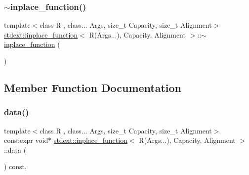 \subsubsection{\texorpdfstring{$\sim$inplace\+\_\+function()}{~inplace\_function()}\hspace{0.1cm}{\footnotesize\ttfamily [2/2]}}
{\footnotesize\ttfamily template$<$class R , class... Args, size\+\_\+t Capacity, size\+\_\+t Alignment$>$ \\
\hyperlink{classstdext_1_1inplace__function}{stdext\+::inplace\+\_\+function}$<$ R(Args...), Capacity, Alignment $>$\+::$\sim$\hyperlink{classstdext_1_1inplace__function}{inplace\+\_\+function} (\begin{DoxyParamCaption}{ }\end{DoxyParamCaption})\hspace{0.3cm}{\ttfamily [inline]}}



\subsection{Member Function Documentation}
\mbox{\label{classstdext_1_1inplace__function_3_01R_07Args_8_8_8_08_00_01Capacity_00_01Alignment_01_4_a2fc2327b65754cc6c20d37d76cb86aa9}} 
\subsubsection{\texorpdfstring{data()}{data()}\hspace{0.1cm}{\footnotesize\ttfamily [1/2]}}
{\footnotesize\ttfamily template$<$class R , class... Args, size\+\_\+t Capacity, size\+\_\+t Alignment$>$ \\
constexpr void$\ast$ \hyperlink{classstdext_1_1inplace__function}{stdext\+::inplace\+\_\+function}$<$ R(Args...), Capacity, Alignment $>$\+::data (\begin{DoxyParamCaption}{ }\end{DoxyParamCaption}) const\hspace{0.3cm}{\ttfamily [inline]}, {\ttfamily [noexcept]}}

